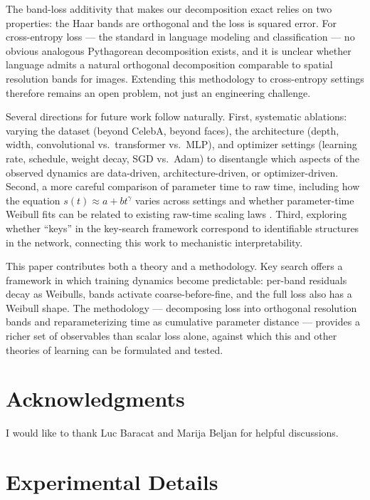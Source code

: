 \documentclass{article}
\begin{document}
The band-loss additivity that makes our decomposition exact relies on 
two properties: the Haar bands are
orthogonal and the loss is squared error. For cross-entropy loss ---
the standard in language modeling and classification --- no obvious analogous
Pythagorean decomposition exists, and it is unclear whether language
admits a natural orthogonal decomposition comparable to spatial
resolution bands for images. Extending this methodology to
cross-entropy settings therefore remains an open problem, not just
an engineering challenge. 

Several directions for future work follow naturally. First, systematic
ablations: varying the dataset (beyond CelebA, beyond faces), the
architecture (depth, width, convolutional vs.\ transformer vs.\ MLP),
and optimizer settings (learning rate, schedule, weight decay, SGD vs.\
Adam) to disentangle which aspects of the observed dynamics are
data-driven, architecture-driven, or optimizer-driven. Second, a more
careful comparison of parameter time to raw time, including how the
equation $s(t) \approx a + bt^\gamma$ varies across settings and
whether parameter-time Weibull fits can be related to existing raw-time
scaling laws \citep{kaplan2020scaling,hoffmann2022training}. Third, exploring whether ``keys''
in the key-search framework correspond to identifiable structures in the
network, connecting this work to mechanistic interpretability.

This paper contributes both a theory and a methodology. Key search
offers a framework in which training dynamics become predictable:
per-band residuals decay as Weibulls, bands activate coarse-before-fine,
and the full loss also has a Weibull shape. The methodology ---
decomposing loss into orthogonal resolution bands and reparameterizing
time as cumulative parameter distance --- provides a richer set of
observables than scalar loss alone, against which this and other
theories of learning can be formulated and tested.

\section*{Acknowledgments}

I would like to thank Luc Baracat and Marija Beljan for helpful discussions.




\appendix

\section{Experimental Details}\label{appendix:experimental-details}
\end{document}
